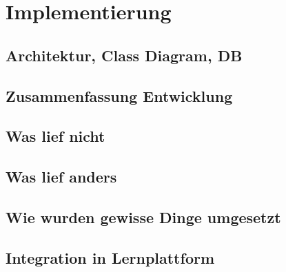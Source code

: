\section{Implementierung}
\subsection{Architektur, Class Diagram, DB}
\subsection{Zusammenfassung Entwicklung}
\subsection{Was lief nicht}
\subsection{Was lief anders}
\subsection{Wie wurden gewisse Dinge umgesetzt}
\subsection{Integration in Lernplattform}
